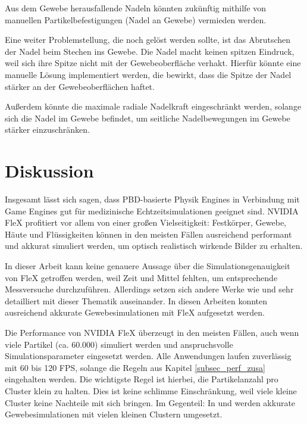 Aus dem Gewebe herausfallende Nadeln könnten zukünftig mithilfe von manuellen Partikelbefestigungen (Nadel an Gewebe) vermieden werden.

Eine weiter Problemstellung, die noch gelöst werden sollte, ist das Abrutschen der Nadel beim Stechen ins Gewebe. Die Nadel macht keinen spitzen Eindruck, weil sich ihre Spitze nicht mit der Gewebeoberfläche verhakt. Hierfür könnte eine manuelle Lösung implementiert werden, die bewirkt, dass die Spitze der Nadel stärker an der Gewebeoberflächen haftet.

Außerdem könnte die maximale radiale Nadelkraft eingeschränkt werden, solange sich die Nadel im Gewebe befindet, um seitliche Nadelbewegungen im Gewebe stärker einzuschränken.

\clearpage
\section{Diskussion}

Insgesamt lässt sich sagen, dass PBD-basierte Physik Engines in Verbindung mit Game Engines gut für  medizinische Echtzeitsimulationen geeignet sind. 
NVIDIA FleX profitiert vor allem von einer großen Vielseitigkeit: Festkörper, Gewebe, Häute und Flüssigkeiten können in den meisten Fällen ausreichend performant und akkurat simuliert werden, um optisch realistisch wirkende Bilder zu erhalten.

In dieser Arbeit kann keine genauere Aussage über die Simulationsgenauigkeit von FleX getroffen werden, weil Zeit und Mittel fehlten, um entsprechende Messversuche durchzuführen. Allerdings setzen sich andere Werke wie \cite{BreastBiopsy} und \cite{PBDKidney} sehr detailliert mit dieser Thematik auseinander. In diesen Arbeiten konnten ausreichend akkurate Gewebesimulationen mit FleX aufgesetzt werden. 

Die Performance von NVIDIA FleX überzeugt in den meisten Fällen, auch wenn viele Partikel (ca. 60.000) simuliert werden und anspruchsvolle Simulationsparameter eingesetzt werden. Alle Anwendungen laufen zuverlässig mit 60 bis 120 FPS, solange die Regeln aus Kapitel \ref{subsec_perf_zusa} eingehalten werden. Die wichtigste Regel ist hierbei, die Partikelanzahl pro Cluster klein zu halten. Dies ist keine schlimme Einschränkung, weil viele kleine Cluster keine Nachteile mit sich bringen. Im Gegenteil: In \cite{BreastBiopsy} und \cite{PBDKidney} werden akkurate Gewebesimulationen mit vielen kleinen Clustern umgesetzt.

